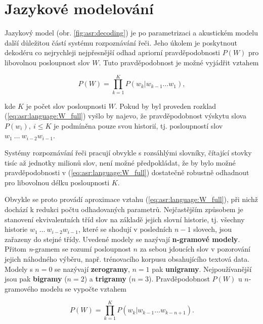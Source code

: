 \section{Jazykové modelování}
\label{chap:asr:language}

Jazykový model (obr. \ref{fig:asr:decoding}) je po parametrizaci a akustickém modelu další důležitou částí systému rozpoznávání řeči. Jeho úkolem je poskytnout dekodéru co nejrychleji nejpřesnější odhad apriorní pravděpodobnosti $P\left(W\right)$ pro libovolnou posloupnost slov $W$. Tuto pravděpodobnost je možné vyjádřit vztahem

\begin{equation}
  P\left(W\right) = \prod_{k=1}^{K} P\left(w_k | w_{k-1}\dots w_{1}\right),
  \label{eq:asr:language:W_full}
\end{equation}

\noindent kde $K$ je počet slov posloupnosti $W$. Pokud by byl proveden rozklad (\ref{eq:asr:language:W_full}) vyšlo by najevo, že pravděpodobnost výskytu slova $P\left(w_i\right),\ i \leq K$ je podmíněna pouze svou historií, tj. posloupností slov $w_1\ \dots\ w_{i-2}w_{i-1}$.

Systémy rozpoznávání řeči pracují obvykle s rozsáhlými slovníky, čítající stovky tisíc až jednotky milionů slov, není možné předpokládat, že by bylo možné pravděpodobnosti v (\ref{eq:asr:language:W_full}) dostatečně robustně odhadnout pro libovolnou délku posloupnosti $K$.

Obvykle se proto provádí aproximace vztahu (\ref{eq:asr:language:W_full}), při nichž dochází k redukci počtu odhadovaných parametrů. Nejčastějším způsobem je stanovení ekvivalentních tříd slov na základě jejich slovní historie, tj. všechny historie $w_1\ \dots\ w_{i-2}w_{i-1}$, které se shodují v posledních $n-1$ slovech, jsou zařazeny do stejné třídy. Uvedené modely se nazývají \textbf{n-gramové modely}. Přitom \textit{n}-gramem se rozumí posloupnost $n$ za sebou jdoucích slov v pozorování jejich náhodného výběru, např. trénovacího korpusu obsahujícího textová data. Modely s $n=0$ se nazývají \textbf{zerogramy}, $n=1$ pak \textbf{unigramy}. Nejpoužívanější jsou pak \textbf{bigramy} ($n=2$) a \textbf{trigramy} ($n=3$). Pravděpodobnost $P\left(W\right)$ u $n$-gramového modelu se vypočte vztahem

\begin{equation}
  P\left(W\right) = \prod_{k=1}^{K} P\left(w_k | w_{k-1}\dots w_{k-n+1}\right).
  \label{eq:asr:language:W}
\end{equation}

